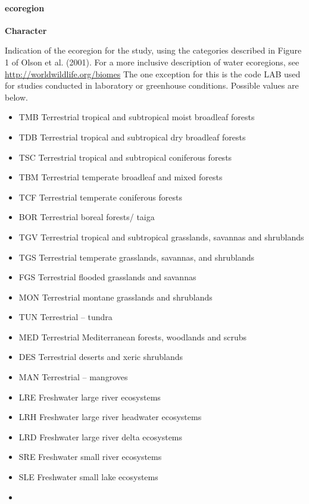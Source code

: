 \documentclass[]{article}
\let\oldparagraph\paragraph
\renewcommand{\paragraph}[1]{\oldparagraph{#1}\mbox{}}
\begin{document}
\paragraph{ecoregion}\label{ecoregion}

\textbf{Character}

Indication of the ecoregion for the study, using the categories
described in Figure 1 of Olson et al. (2001). For a more inclusive
description of water ecoregions, see
\url{http://worldwildlife.org/biomes} The one exception for this is the
code LAB used for studies conducted in laboratory or greenhouse
conditions. Possible values are below.

\begin{itemize}
\item
  TMB Terrestrial tropical and subtropical moist broadleaf forests
\item
  TDB Terrestrial tropical and subtropical dry broadleaf forests
\item
  TSC Terrestrial tropical and subtropical coniferous forests
\item
  TBM Terrestrial temperate broadleaf and mixed forests
\item
  TCF Terrestrial temperate coniferous forests
\item
  BOR Terrestrial boreal forests/ taiga
\item
  TGV Terrestrial tropical and subtropical grasslands, savannas and
  shrublands
\item
  TGS Terrestrial temperate grasslands, savannas, and shrublands
\item
  FGS Terrestrial flooded grasslands and savannas
\item
  MON Terrestrial montane grasslands and shrublands
\item
  TUN Terrestrial -- tundra
\item
  MED Terrestrial Mediterranean forests, woodlands and scrubs
\item
  DES Terrestrial deserts and xeric shrublands
\item
  MAN Terrestrial -- mangroves
\item
  LRE Freshwater large river ecosystems
\item
  LRH Freshwater large river headwater ecosystems
\item
  LRD Freshwater large river delta ecosystems
\item
  SRE Freshwater small river ecosystems
\item
  SLE Freshwater small lake ecosystems
\item

\end{itemize}
\end{document}

